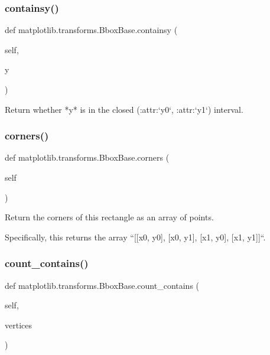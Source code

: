 \subsubsection{\texorpdfstring{containsy()}{containsy()}}
{\footnotesize\ttfamily def matplotlib.\+transforms.\+Bbox\+Base.\+containsy (\begin{DoxyParamCaption}\item[{}]{self,  }\item[{}]{y }\end{DoxyParamCaption})}

\begin{DoxyVerb}Return whether *y* is in the closed (:attr:`y0`, :attr:`y1`) interval.
\end{DoxyVerb}
 \mbox{\label{classmatplotlib_1_1transforms_1_1BboxBase_ab9a4fca6d0dbc3d413409b9fad0bef50}} 
\subsubsection{\texorpdfstring{corners()}{corners()}}
{\footnotesize\ttfamily def matplotlib.\+transforms.\+Bbox\+Base.\+corners (\begin{DoxyParamCaption}\item[{}]{self }\end{DoxyParamCaption})}

\begin{DoxyVerb}Return the corners of this rectangle as an array of points.

Specifically, this returns the array
``[[x0, y0], [x0, y1], [x1, y0], [x1, y1]]``.
\end{DoxyVerb}
 \mbox{\label{classmatplotlib_1_1transforms_1_1BboxBase_aaa8aac7e0228746fb8e124b18a4b205b}} 
\subsubsection{\texorpdfstring{count\+\_\+contains()}{count\_contains()}}
{\footnotesize\ttfamily def matplotlib.\+transforms.\+Bbox\+Base.\+count\+\_\+contains (\begin{DoxyParamCaption}\item[{}]{self,  }\item[{}]{vertices }\end{DoxyParamCaption})}

